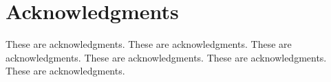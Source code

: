 \section*{Acknowledgments}
		These are acknowledgments. These are acknowledgments. These are acknowledgments. These are acknowledgments. These are acknowledgments. These are acknowledgments.